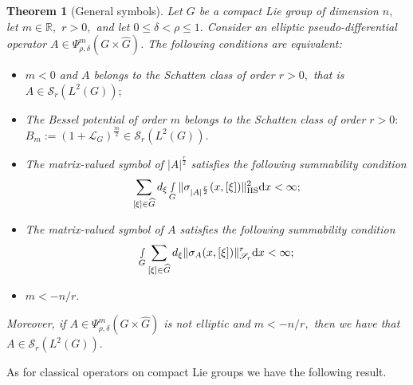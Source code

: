 \documentclass[12pt, reqno]{amsart}
\newtheorem{theorem}{Theorem}[section]
\theoremstyle{definition}
\theoremstyle{remark}
\numberwithin{equation}{section}
\begin{document}
\begin{theorem}[General symbols]\label{CardonaRuzhanskyChatzakouToft2022Th1} Let $G$ be a compact Lie group of dimension $n,$ let $m\in \mathbb{R},$ $r>0, $ and let $0\leq \delta<\rho\leq 1.$  Consider an elliptic pseudo-differential operator $A\in \Psi^m_{\rho,\delta}(G\times \widehat{G})$. The following conditions are equivalent:
    \begin{itemize}
    \item[(1)] $m<0$ and  $A$ belongs to the Schatten class of order $r>0,$ that is $A\in \mathscr{S}_r(L^2(G));$
    \item[(2)] The Bessel potential of order $m$ belongs to the Schatten class of order $r>0:$ $B_{m}:=(1+\mathcal{L}_G)^{\frac{m}{2}}\in \mathscr{S}_r(L^2(G)). $
    \item[(3)] The matrix-valued symbol of $|A|^{\frac{r}{2}}$ satisfies the following summability condition
    \begin{equation}
        \sum_{[\xi]\in \widehat{G}}d_\xi\smallint\limits_G\|\sigma_{|A|^{\frac{r}{2}}}(x,[\xi])\|_{\textnormal{HS} }^2\textnormal{d}x<\infty;
    \end{equation}
    \item[(4)] The matrix-valued symbol of $A$ satisfies the following summability condition
    \begin{equation}
        \smallint\limits_G\sum_{[\xi]\in \widehat{G}}d_\xi\|\sigma_{A}(x,[\xi])\|_{\mathscr{S}_r }^r\textnormal{d}x<\infty;
    \end{equation}
    \item[(5)] $m<-n/r.$
\end{itemize} 
     Moreover, if $A\in \Psi^m_{\rho,\delta}(G\times \widehat{G})$ is not elliptic and $m<-n/r,$ then we have that  $A\in \mathscr{S}_{r}(L^2(G)).$
\end{theorem}
As for classical operators on compact Lie groups we have the following result.
\end{document}
